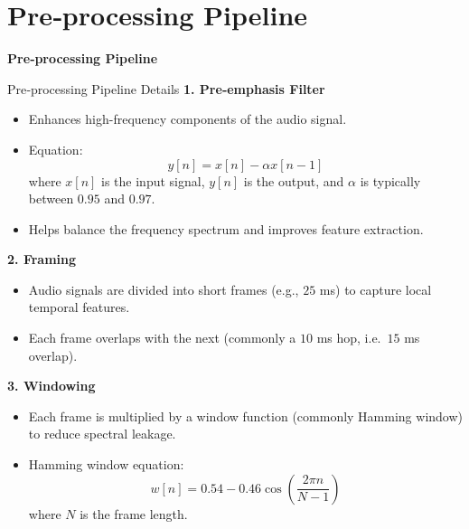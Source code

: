 \section{Pre‑processing Pipeline}
\begin{frame}{}
    \LARGE \textbf{Pre‑processing Pipeline}
\end{frame}

\begin{frame}[allowframebreaks]{Pre‑processing Pipeline Details}
    \textbf{1. Pre‑emphasis Filter}

    \begin{itemize}
        \item Enhances high-frequency components of the audio signal.
        \item Equation:
        \[
            y[n] = x[n] - \alpha x[n-1]
        \]
        where $x[n]$ is the input signal, $y[n]$ is the output, and $\alpha$ is typically between $0.95$ and $0.97$.
        \item Helps balance the frequency spectrum and improves feature extraction.
    \end{itemize}

    \vspace{1em}
    \textbf{2. Framing}

    \begin{itemize}
        \item Audio signals are divided into short frames (e.g., $25$ ms) to capture local temporal features.
        \item Each frame overlaps with the next (commonly a $10$ ms hop, i.e.\ $15$ ms overlap).
    \end{itemize}

    \vspace{1em}
    \textbf{3. Windowing}

    \begin{itemize}
        \item Each frame is multiplied by a window function (commonly Hamming window) to reduce spectral leakage.
        \item Hamming window equation:
        \[
            w[n] = 0.54 - 0.46 \cos\left(\frac{2\pi n}{N-1}\right)
        \]
        where $N$ is the frame length.
    \end{itemize}


    \framebreak


\end{frame}
